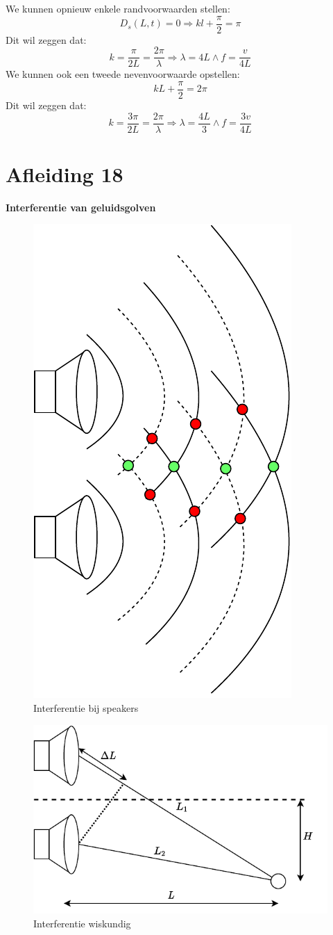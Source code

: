 \documentclass[a4paper,kul]{kulakarticle} %
\begin{document}
We kunnen opnieuw enkele randvoorwaarden stellen:
\begin{equation*}
	D_s(L,t)=0\Rightarrow kl+\frac{\pi}{2} = \pi
\end{equation*}
Dit wil zeggen dat:
\begin{equation*}
	k=\frac{\pi}{2L}=\frac{2\pi}{\lambda}\Rightarrow \lambda=4L \wedge f=\frac{v}{4L}
\end{equation*}
We kunnen ook een tweede nevenvoorwaarde opstellen:
\begin{equation*}
	kL+\frac{\pi}{2}=2\pi
\end{equation*}
Dit wil zeggen dat:
\begin{equation*}
	k=\frac{3\pi}{2L}=\frac{2\pi}{\lambda}\Rightarrow \lambda=\frac{4L}{3} \wedge f=\frac{3v}{4L}
\end{equation*}
\newpage
\section{Afleiding 18}
\textbf{Interferentie van geluidsgolven}\\
\begin{figure}[h]
	\centering
	\includegraphics[width=0.3\linewidth,angle=90]{InterferentieSpeakers}
	\caption[Interferentie]{Interferentie bij speakers}
	\label{fig:interferentiespeakers}
\end{figure}
\begin{figure}[h]
	\centering
	\includegraphics[width=0.5\linewidth]{SpeakersWiskundig}
	\caption[Interferentie wiskundig]{Interferentie wiskundig}
	\label{fig:speakerswiskundig}
\end{figure}\\
\end{document}
